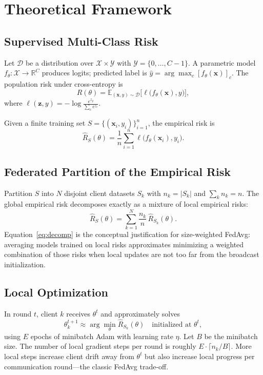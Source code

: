 \documentclass[journal]{IEEEtran}
\begin{document}
\section{Theoretical Framework}
\label{sec:theory}

\subsection{Supervised Multi-Class Risk}
Let $\mathcal{D}$ be a distribution over $\mathcal{X}\times\mathcal{Y}$ with $\mathcal{Y}=\{0,\ldots,C-1\}$. A parametric model $f_{\theta}:\mathcal{X}\to\mathbb{R}^{C}$ produces logits; predicted label is $\hat{y}=\arg\max_{c} [f_{\theta}(\mathbf{x})]_{c}$. The population risk under cross-entropy is
\begin{equation}
\label{eq:risk}
R(\theta) = \mathbb{E}_{(\mathbf{x},y)\sim\mathcal{D}} \Big[ \ell\big(f_{\theta}(\mathbf{x}), y\big) \Big],
\end{equation}
where $\ell(\mathbf{z},y)=-\log\frac{e^{z_y}}{\sum_{c}e^{z_c}}$.

Given a finite training set $S=\{(\mathbf{x}_i,y_i)\}_{i=1}^{n}$, the empirical risk is
\begin{equation}
\hat{R}_S(\theta)=\frac{1}{n}\sum_{i=1}^{n}\ell\big(f_{\theta}(\mathbf{x}_i),y_i\big).
\end{equation}

\subsection{Federated Partition of the Empirical Risk}
Partition $S$ into $N$ disjoint client datasets $S_k$ with $n_k=|S_k|$ and $\sum_k n_k=n$. The global empirical risk decomposes exactly as a mixture of local empirical risks:
\begin{equation}
\label{eq:decomp}
\hat{R}_S(\theta)=\sum_{k=1}^{N} \frac{n_k}{n}\,\hat{R}_{S_k}(\theta).
\end{equation}
Equation~\eqref{eq:decomp} is the conceptual justification for size-weighted FedAvg: averaging models trained on local risks approximates minimizing a weighted combination of those risks when local updates are not too far from the broadcast initialization.

\subsection{Local Optimization}
In round $t$, client $k$ receives $\theta^{t}$ and approximately solves
\begin{equation}
\theta_k^{t+1} \approx \arg\min_{\theta} \hat{R}_{S_k}(\theta)
\quad\text{initialized at }\theta^{t},
\end{equation}
using $E$ epochs of minibatch Adam with learning rate $\eta$. Let $B$ be the minibatch size. The number of local gradient steps per round is roughly $E\cdot\lceil n_k/B\rceil$. More local steps increase client drift away from $\theta^{t}$ but also increase local progress per communication round---the classic FedAvg trade-off.
\end{document}
